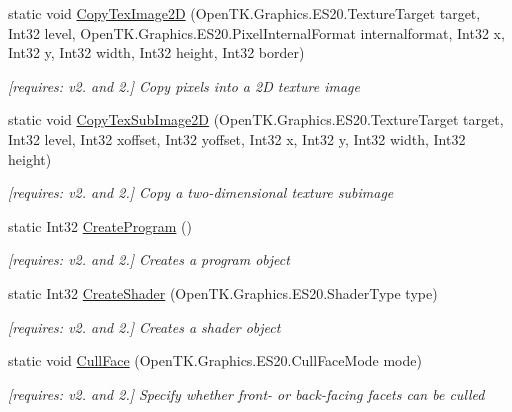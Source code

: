 \begin{DoxyCompactItemize}
static void \hyperlink{class_open_t_k_1_1_graphics_1_1_e_s20_1_1_g_l_aa34a39411f9e50b9db65eb8584468c34}{Copy\-Tex\-Image2\-D} (Open\-T\-K.\-Graphics.\-E\-S20.\-Texture\-Target target, Int32 level, Open\-T\-K.\-Graphics.\-E\-S20.\-Pixel\-Internal\-Format internalformat, Int32 x, Int32 y, Int32 width, Int32 height, Int32 border)
\begin{DoxyCompactList}\small\item\em \mbox{[}requires\-: v2. and 2.\mbox{]} Copy pixels into a 2\-D texture image \end{DoxyCompactList}\item 
static void \hyperlink{class_open_t_k_1_1_graphics_1_1_e_s20_1_1_g_l_a9773dffccf836af004b4a08da10e6fda}{Copy\-Tex\-Sub\-Image2\-D} (Open\-T\-K.\-Graphics.\-E\-S20.\-Texture\-Target target, Int32 level, Int32 xoffset, Int32 yoffset, Int32 x, Int32 y, Int32 width, Int32 height)
\begin{DoxyCompactList}\small\item\em \mbox{[}requires\-: v2. and 2.\mbox{]} Copy a two-\/dimensional texture subimage \end{DoxyCompactList}\item 
static Int32 \hyperlink{class_open_t_k_1_1_graphics_1_1_e_s20_1_1_g_l_a7a949418f1a580108fdc773053cbad28}{Create\-Program} ()
\begin{DoxyCompactList}\small\item\em \mbox{[}requires\-: v2. and 2.\mbox{]} Creates a program object \end{DoxyCompactList}\item 
static Int32 \hyperlink{class_open_t_k_1_1_graphics_1_1_e_s20_1_1_g_l_a54ad2ee370e5d17a6655d584f7720151}{Create\-Shader} (Open\-T\-K.\-Graphics.\-E\-S20.\-Shader\-Type type)
\begin{DoxyCompactList}\small\item\em \mbox{[}requires\-: v2. and 2.\mbox{]} Creates a shader object \end{DoxyCompactList}\item 
static void \hyperlink{class_open_t_k_1_1_graphics_1_1_e_s20_1_1_g_l_ab340c393284baa447a7ebd2309dd429c}{Cull\-Face} (Open\-T\-K.\-Graphics.\-E\-S20.\-Cull\-Face\-Mode mode)
\begin{DoxyCompactList}\small\item\em \mbox{[}requires\-: v2. and 2.\mbox{]} Specify whether front-\/ or back-\/facing facets can be culled \end{DoxyCompactList}\item 

\end{DoxyCompactItemize}
